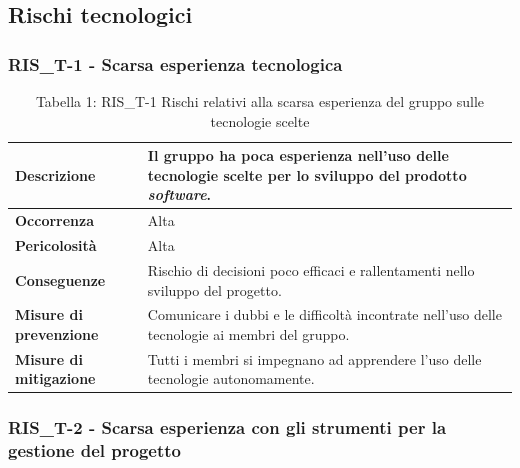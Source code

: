 \documentclass[a4paper,10pt]{article}
\begin{document}
\subsection{Rischi tecnologici}
\subsubsection{RIS\_T-1 - Scarsa esperienza tecnologica}

\begin{table}[H]
\centering
\renewcommand{\arraystretch}{1.3}

\begin{tabularx}{\textwidth}{|p{4cm}|X|}
\hline
\textbf{Descrizione} & 
Il gruppo ha poca esperienza nell’uso delle tecnologie scelte per lo sviluppo del prodotto \textit{software}. \\ \hline

\textbf{Occorrenza} & Alta \\ \hline

\textbf{Pericolosità} & Alta \\ \hline

\textbf{Conseguenze} & 
Rischio di decisioni poco efficaci e rallentamenti nello sviluppo del progetto. \\ \hline

\textbf{Misure di prevenzione} & Comunicare i dubbi e le difficoltà incontrate nell’uso delle tecnologie ai membri del gruppo. \\ \hline

\textbf{Misure di mitigazione} &
Tutti i membri si impegnano ad apprendere l’uso delle tecnologie autonomamente. \\ \hline

\end{tabularx}

\caption{Tabella 1: RIS\_T-1 Rischi relativi alla scarsa esperienza del gruppo sulle tecnologie scelte}
\end{table}

\subsubsection{RIS\_T-2 - Scarsa esperienza con gli strumenti per la gestione del progetto}
\end{document}
